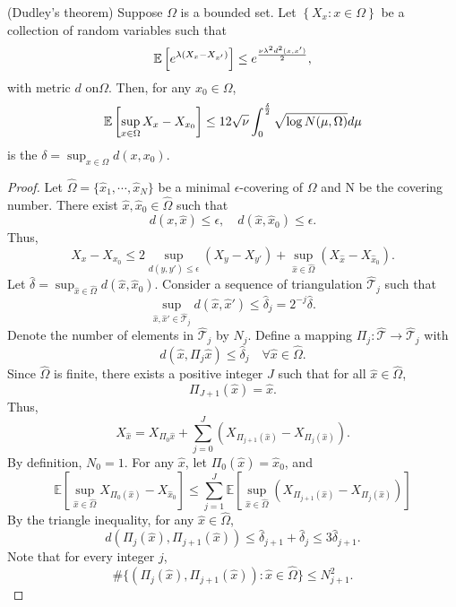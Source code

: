\fi
\begin{theorem}\label{th:dudley}
(Dudley's theorem) Suppose $\Omega$ is a bounded set. Let $\left\{X_x: x \in \Omega\right\}$ be a collection of random variables such that 
$$
\mathbb{E}\left[ e^{\lambda (X_x - X_{x'})}\right]\le e^{\nu\lambda^2 d^2(x, x')\over 2},
$$
with metric $d$ on$\Omega$.
Then, for any $x_0\in \Omega$,
\begin{equation}\label{eq:dudley}
\mathbb{E}\left[\sup _{x \in \Omega} X_x-X_{x_0}\right] \leq 12\sqrt{\nu}\int_0^{\delta\over 2} \sqrt{\log N(\mu, \Omega)} d \mu
\end{equation}
is the $\displaystyle \delta=\sup_{x\in \Omega} d(x, x_0)$.
\end{theorem}
\begin{proof}
Let $\hat{\Omega}=\{\hat x_1, \cdots, \hat x_N\}$ be a minimal $\epsilon$-covering of $\Omega$ and N be the covering number. There exist $\hat x, \hat x_0\in \hat{\Omega}$ such that
$$
d(x, \hat x)\le \epsilon,\quad d(\hat x, \hat x_0)\le \epsilon.
$$
Thus,
\begin{equation}
X_x - X_{x_0}\le 2\sup_{d(y,y')\le \epsilon} (X_y - X_{y'}) + \sup_{\hat x\in \hat{\Omega}} (X_{\hat x} - X_{\hat x_0}).
\end{equation} 
Let $\displaystyle \hat \delta=\sup_{\hat x\in \hat \Omega} d(\hat x, \hat x_0)$.
Consider a sequence of triangulation $\hat{\mathcal{T}}_j$ such that 
$$
\sup_{\hat x, \hat x'\in\hat{\mathcal{T}}_j}d(\hat x, \hat x')\le \hat \delta_j=2^{-j}\hat \delta.
$$
Denote the number of elements in $\hat{\mathcal{T}}_j$ by $N_j$.
Define a mapping $\Pi_j: \hat{\mathcal{T}}\rightarrow \hat{\mathcal{T}}_j$ with
$$
d(\hat x, \Pi_j \hat x)\le \hat \delta_j\quad \forall \hat x\in \hat \Omega.
$$
Since $\hat \Omega$ is finite, there exists a positive integer $J$ such that for all $\hat x\in \hat \Omega$,
$$
\Pi_{J+1}(\hat x)=\hat x.
$$
Thus,
$$
X_{\hat{x}}=X_{\Pi_0 \hat{x}} + \sum_{j=0}^J (X_{\Pi_{j+1}(\hat{x})} - X_{\Pi_{j}(\hat{x})}).
$$
By definition, $N_0=1$.
For any $\hat x$, let $\Pi_0 (\hat{x})=\hat{x}_0$, and
$$
\mathbb{E}\left [ \sup_{\hat{x}\in \hat  \Omega } X_{\Pi_0 (\hat{x})} - X_{\hat{x}_0}\right]\leq \sum_{j=1}^J \mathbb{E}\left [ \sup_{\hat{x}\in \hat \Omega} (X_{\Pi_{j+1} (\hat x)} - X_{\Pi_j (\hat x)})\right]
$$
By the triangle inequality, for any $\hat x\in \hat \Omega$,
$$
d(\Pi_j(\hat x), \Pi_{j+1}(\hat x))\le \hat \delta_{j+1} + \hat \delta_{j}\le 3\hat \delta_{j+1}.
$$
Note that for every integer $j$,
$$
\# \{(\Pi_j(\hat x), \Pi_{j+1}(\hat x)): \hat x\in \hat \Omega\} \le N_{j+1}^2.
$$
\end{proof}
